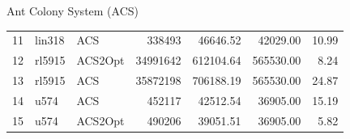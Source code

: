 \documentclass{beamer}
\begin{document}
\begin{frame}{Ant Colony System (ACS)}
\begin{table}[H]
\begin{tabular}{lllrrrr}
            11 & lin318   & ACS       & 338493     & 46646.52       & 42029.00         & 10.99 \\
            12 & rl5915   & ACS2Opt   & 34991642   & 612104.64      & 565530.00        & 8.24  \\
            13 & rl5915   & ACS       & 35872198   & 706188.19      & 565530.00        & 24.87 \\
            14 & u574     & ACS       & 452117     & 42512.54       & 36905.00         & 15.19 \\
            15 & u574     & ACS2Opt   & 490206     & 39051.51       & 36905.00         & 5.82  \\
            \bottomrule
        \end{tabular}
    \end{table}


\end{frame}
\end{document}
